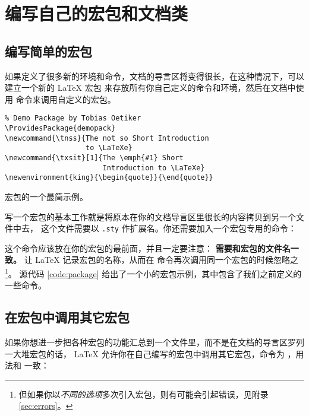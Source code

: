 \section{编写自己的宏包和文档类}\label{sec:packages}

\subsection{编写简单的宏包}\label{subsec:provide-pkg}

如果定义了很多新的环境和命令，文档的导言区将变得很长，在这种情况下，可以建立一个新的 \LaTeX{} 宏包
来存放所有你自己定义的命令和环境，然后在文档中使用  命令来调用自定义的宏包。

\begin{sourcecode}[htp]
\begin{Verbatim}
% Demo Package by Tobias Oetiker
\ProvidesPackage{demopack}
\newcommand{\tnss}{The not so Short Introduction
                   to \LaTeXe}
\newcommand{\txsit}[1]{The \emph{#1} Short
                       Introduction to \LaTeXe}
\newenvironment{king}{\begin{quote}}{\end{quote}}
\end{Verbatim}
\caption{宏包的一个最简示例。}\label{code:package}
\end{sourcecode}

写一个宏包的基本工作就是将原本在你的文档导言区里很长的内容拷贝到另一个文件中去，
 这个文件需要以 \texttt{.sty} 作扩展名。你还需要加入一个宏包专用的命令：
\begin{command}
\end{command}
这个命令应该放在你的宏包的最前面，并且一定要注意：\textbf{ 需要和宏包的文件名一致。}
 让 \LaTeX{} 记录宏包的名称，从而在  命令再次调用同一个宏包的时候忽略之%
\footnote{但如果你以\emph{不同的选项}多次引入宏包，则有可能会引起错误，见附录 \ref{sec:errors}。}。
源代码 \ref{code:package} 给出了一个小的宏包示例，其中包含了我们之前定义的一些命令。

\subsection{在宏包中调用其它宏包}\label{subsec:require-pkg}

如果你想进一步把各种宏包的功能汇总到一个文件里，而不是在文档的导言区罗列一大堆宏包的话，
\LaTeX{} 允许你在自己编写的宏包中调用其它宏包，命令为 ，用法和 
一致：
\begin{command}
\end{command}


